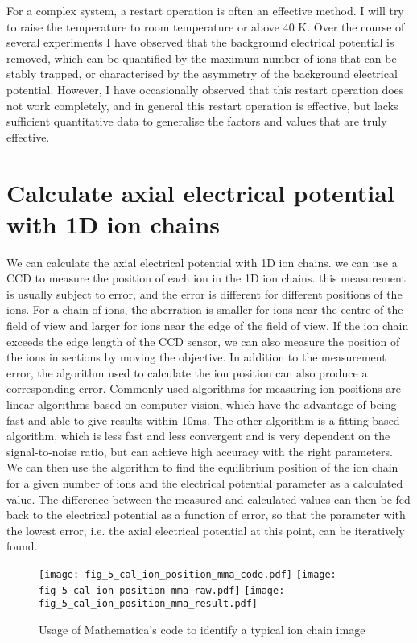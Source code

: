 For a complex system, a restart operation is often an effective method. I will try to raise the temperature to room temperature or above 40 K. Over the course of several experiments I have observed that the background electrical potential is removed, which can be quantified by the maximum number of ions that can be stably trapped, or characterised by the asymmetry of the background electrical potential. However, I have occasionally observed that this restart operation does not work completely, and in general this restart operation is effective, but lacks sufficient quantitative data to generalise the factors and values that are truly effective.



\section{Calculate axial electrical potential with 1D ion chains}

We can calculate the axial electrical potential with 1D ion chains. we can use a CCD to measure the position of each ion in the 1D ion chains. this measurement is usually subject to error, and the error is different for different positions of the ions. For a chain of ions, the aberration is smaller for ions near the centre of the field of view and larger for ions near the edge of the field of view. If the ion chain exceeds the edge length of the CCD sensor, we can also measure the position of the ions in sections by moving the objective. In addition to the measurement error, the algorithm used to calculate the ion position can also produce a corresponding error. Commonly used algorithms for measuring ion positions are linear algorithms based on computer vision, which have the advantage of being fast and able to give results within 10ms. The other algorithm is a fitting-based algorithm, which is less fast and less convergent and is very dependent on the signal-to-noise ratio, but can achieve high accuracy with the right parameters. We can then use the algorithm to find the equilibrium position of the ion chain for a given number of ions and the electrical potential parameter as a calculated value. The difference between the measured and calculated values can then be fed back to the electrical potential as a function of error, so that the parameter with the lowest error, i.e. the axial electrical potential at this point, can be iteratively found.

\begin{figure}
    \centering
    {\texttt{[image: fig\_5\_cal\_ion\_position\_mma\_code.pdf]}}
    {\texttt{[image: fig\_5\_cal\_ion\_position\_mma\_raw.pdf]}}
    {\texttt{[image: fig\_5\_cal\_ion\_position\_mma\_result.pdf]}}
    \caption{Usage of Mathematica's code to identify a typical ion chain image}
    \label{fig:cal_ion_position_mma}
\end{figure}

